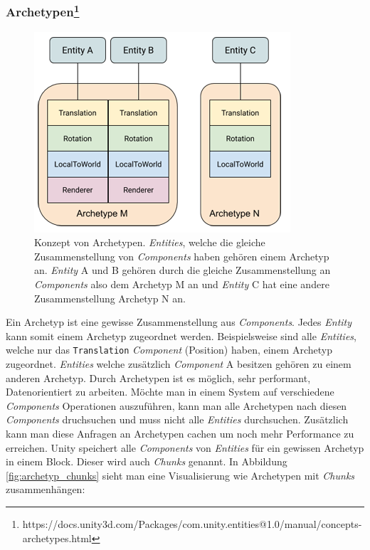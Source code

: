\subsubsection{Archetypen\footnote{https://docs.unity3d.com/Packages/com.unity.entities@1.0/manual/concepts-archetypes.html}}
\begin{figure}[H]
\begin{center}
\includegraphics[scale=0.7]{Bilder/ArchetypeConcept.png}
\caption{Konzept von Archetypen. \textit{Entities}, welche die gleiche Zusammenstellung von \textit{Components} haben gehören einem Archetyp an. \textit{Entity} A und B gehören durch die gleiche Zusammenstellung an \textit{Components} also dem Archetyp M an und \textit{Entity} C hat eine andere Zusammenstellung Archetyp N an.}
\label{fig:archetype_concept}
\end{center}
\end{figure}
Ein Archetyp ist eine gewisse Zusammenstellung aus \textit{Components}. Jedes \textit{Entity} kann somit einem Archetyp zugeordnet werden. Beispielsweise sind alle \textit{Entities}, welche nur das \texttt{Translation} \textit{Component} (Position) haben, einem Archetyp zugeordnet. \textit{Entities} welche zusätzlich \textit{Component} A besitzen gehören zu einem anderen Archetyp. Durch Archetypen ist es möglich, sehr performant, Datenorientiert zu arbeiten. Möchte man in einem System auf verschiedene \textit{Components} Operationen auszuführen, kann man alle Archetypen nach diesen \textit{Components} druchsuchen und muss nicht alle \textit{Entities} durchsuchen. Zusätzlich kann man diese Anfragen an Archetypen cachen um noch mehr Performance zu erreichen. Unity speichert alle \textit{Components} von \textit{Entities} für ein gewissen Archetyp in einem Block. Dieser wird auch \textit{Chunks} genannt. In Abbildung \ref{fig:archetyp_chunks} sieht man eine Visualisierung wie Archetypen mit \textit{Chunks} zusammenhängen:

